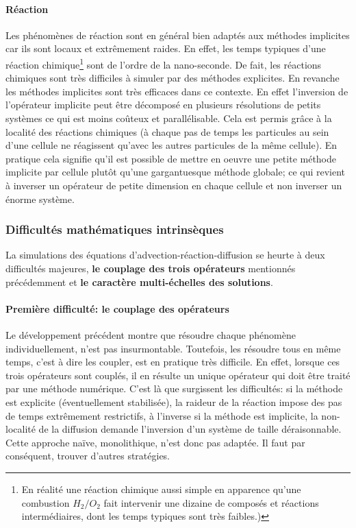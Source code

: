 \paragraph{Réaction}
    Les phénomènes de réaction sont en général bien adaptés aux méthodes implicites car ils sont locaux et extrêmement raides.
    En effet, les temps typiques d'une réaction chimique\footnote{
    En réalité une réaction chimique aussi simple en apparence qu'une combustion $H_2/O_2$ fait intervenir une dizaine de composés et réactions intermédiaires, dont les temps typiques sont très faibles.)} sont de l'ordre de la nano-seconde.
    De fait, les réactions chimiques sont très difficiles à simuler par des méthodes explicites.
    En revanche les méthodes implicites sont très efficaces dans ce contexte. En effet l'inversion de l'opérateur implicite 
    peut être décomposé en plusieurs résolutions de petits systèmes ce qui est moins coûteux et parallélisable. Cela est permis grâce à la localité des réactions chimiques
    (à chaque pas de temps les particules au sein d'une cellule ne réagissent qu'avec les autres particules de la même cellule).
    En pratique cela signifie qu'il est possible de mettre en oeuvre une petite méthode implicite par cellule plutôt qu'une gargantuesque méthode globale; 
    ce qui revient à inverser un opérateur de petite dimension en chaque cellule et non inverser un énorme système.

\subsubsection{Difficultés mathématiques intrinsèques}
    La simulations des équations d'advection-réaction-diffusion se heurte à deux difficultés majeures, \textbf{le couplage des trois opérateurs} mentionnés précédemment
    et \textbf{le caractère multi-échelles des solutions}.

    \paragraph{Première difficulté: le couplage des opérateurs}
        Le développement précédent montre que résoudre chaque phénomène individuellement, n'est pas insurmontable. 
        Toutefois, les résoudre tous en même temps, c'est à dire les coupler, est en pratique très difficile.
        En effet, lorsque ces trois opérateurs sont couplés, il en résulte un unique opérateur qui doit être traité par une méthode numérique.
        C'est là que surgissent les difficultés: si la méthode est explicite (éventuellement stabilisée), la raideur de la réaction impose des pas de temps extrêmement restrictifs,
        à l'inverse si la méthode est implicite, la non-localité de la diffusion demande l'inversion d'un système de taille déraisonnable. 
        Cette approche naïve, monolithique, n'est donc pas adaptée. Il faut par conséquent, trouver d'autres stratégies.

